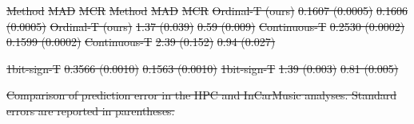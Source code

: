 \documentclass[11pt]{article}
\theoremstyle{plain}
\theoremstyle{definition}
\providecommand{\DIFdeltex}[1]{{\protect\color{red}\sout{#1}}}                      %
\providecommand{\DIFdelFL}[1]{\DIFdel{#1}} %
\providecommand{\DIFdel}[1]{\texorpdfstring{\DIFdeltex{#1}}{}} %
\begin{document}
\DIFdelFL{Method                    }%
\DIFdelFL{MAD }%
\DIFdelFL{MCR }%
\DIFdelFL{Method                    }%
\DIFdelFL{MAD }%
\DIFdelFL{MCR}%
\DIFdelFL{Ordinal-T (ours) }%
\DIFdelFL{0.1607 (0.0005)}%
\DIFdelFL{0.1606 (0.0005)}%
\DIFdelFL{Ordinal-T (ours) }%
\DIFdelFL{1.37 (0.039) }%
\DIFdelFL{0.59 (0.009)}%
\DIFdelFL{Continuous-T}%
\DIFdelFL{0.2530 (0.0002)}%
\DIFdelFL{0.1599 (0.0002)}%
\DIFdelFL{Continuous-T }%
\DIFdelFL{2.39 (0.152)}%
\DIFdelFL{0.94 (0.027)}%

\DIFdelFL{1bit-sign-T}%
\DIFdelFL{0.3566 (0.0010)}%
\DIFdelFL{0.1563 (0.0010)}%
\DIFdelFL{1bit-sign-T}%
\DIFdelFL{1.39 (0.003)}%
\DIFdelFL{0.81 (0.005)}%

{%
\DIFdelFL{Comparison of prediction error in the HPC and InCarMusic analyses. Standard errors are reported in parentheses.}}%

\end{document}
